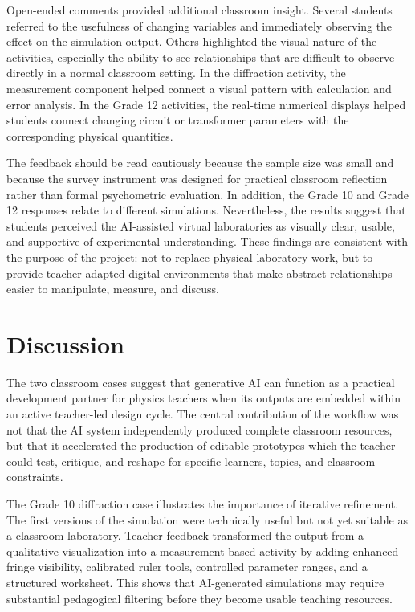 \documentclass{iopjournal}
\begin{document}
Open-ended comments provided additional classroom insight. Several students referred to the usefulness of changing variables and immediately observing the effect on the simulation output. Others highlighted the visual nature of the activities, especially the ability to see relationships that are difficult to observe directly in a normal classroom setting. In the diffraction activity, the measurement component helped connect a visual pattern with calculation and error analysis. In the Grade 12 activities, the real-time numerical displays helped students connect changing circuit or transformer parameters with the corresponding physical quantities.

The feedback should be read cautiously because the sample size was small and because the survey instrument was designed for practical classroom reflection rather than formal psychometric evaluation. In addition, the Grade 10 and Grade 12 responses relate to different simulations. Nevertheless, the results suggest that students perceived the AI-assisted virtual laboratories as visually clear, usable, and supportive of experimental understanding. These findings are consistent with the purpose of the project: not to replace physical laboratory work, but to provide teacher-adapted digital environments that make abstract relationships easier to manipulate, measure, and discuss.

\section{Discussion}

The two classroom cases suggest that generative AI can function as a practical development partner for physics teachers when its outputs are embedded within an active teacher-led design cycle. The central contribution of the workflow was not that the AI system independently produced complete classroom resources, but that it accelerated the production of editable prototypes which the teacher could test, critique, and reshape for specific learners, topics, and classroom constraints.

The Grade 10 diffraction case illustrates the importance of iterative refinement. The first versions of the simulation were technically useful but not yet suitable as a classroom laboratory. Teacher feedback transformed the output from a qualitative visualization into a measurement-based activity by adding enhanced fringe visibility, calibrated ruler tools, controlled parameter ranges, and a structured worksheet. This shows that AI-generated simulations may require substantial pedagogical filtering before they become usable teaching resources.
\end{document}
